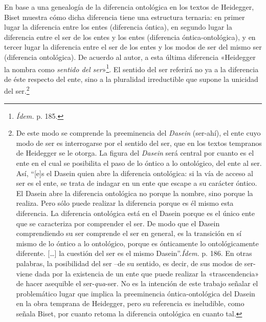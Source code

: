 En base a una genealogía de la diferencia ontológica en los textos de Heidegger, Biset muestra cómo dicha diferencia tiene una estructura ternaria: en primer lugar la diferencia entre los entes (diferencia óntica), en segundo lugar la diferencia entre el ser de los entes y los entes (diferencia óntica-ontológica), y en tercer lugar la diferencia entre el ser de los entes y los modos de ser del mismo ser (diferencia ontológica). De acuerdo al autor, a esta última diferencia «Heidegger la nombra como \emph{sentido del ser}»\footnote{\emph{Ídem.} p. 185.}. El sentido del ser referirá no ya a la diferencia de éste respecto del ente, sino a la pluralidad irreductible que supone la unicidad del ser.\footnote{De este modo se comprende la preeminencia del \emph{Dasein} (ser-ahí), el ente cuyo modo de ser es interrogarse por el sentido del ser, que en los textos tempranos de Heidegger se le otorga. La figura del \emph{Dasein} será central por cuanto es el ente en el cual se posibilita el paso de lo óntico a lo ontológico, del ente al ser. Así, ``{[}e{]}s el Dasein quien abre la diferencia ontológica: si la vía de acceso al ser es el ente, se trata de indagar en un ente que escape a su carácter óntico. El Dasein abre la diferencia ontológica no porque la nombre, sino porque la realiza. Pero sólo puede realizar la diferencia porque es él mismo esta diferencia. La diferencia ontológica está en el Dasein porque es el único ente que se caracteriza por comprender el ser. De modo que el Dasein comprendiendo su ser comprende el ser en general, es la transición en sí mismo de lo óntico a lo ontológico, porque es ónticamente lo ontológicamente diferente. {[}\ldots{]} la cuestión del ser es el mismo Dasein''.\emph{Ídem.} p. 186. En otras palabras, la posibilidad del ser --de su sentido, es decir, de sus modos de ser- viene dada por la existencia de un ente que puede realizar la «trascendencia» de hacer asequible el ser-\emph{qua}-ser. No es la intención de este trabajo señalar el problemático lugar que implica la preeminencia óntica-ontológica del Dasein en la obra temprana de Heidegger, pero su referencia es ineludible, como señala Biset, por cuanto retoma la diferencia ontológica en cuanto tal.}

